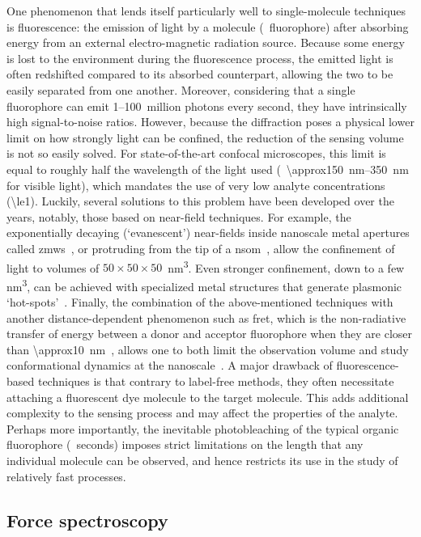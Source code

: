 One phenomenon that lends itself particularly well to single-molecule techniques is fluorescence: the
emission of light by a molecule (\ie~fluorophore) after absorbing energy from an external electro-magnetic
radiation source. Because some energy is lost to the environment during the fluorescence process, the emitted
light is often redshifted compared to its absorbed counterpart, allowing the two to be easily separated from
one another. Moreover, considering that a single fluorophore can emit \numrange{1}{100}~million photons every
second, they have intrinsically high signal-to-noise ratios. However, because the diffraction poses a physical
lower limit on how strongly light can be confined, the reduction of the sensing volume is not so easily
solved. For state-of-the-art confocal microscopes, this limit is equal to roughly half the wavelength of the
light used (\ie~\SIrange{\approx150}{350}{\nm} for visible light), which mandates the use of very low
analyte concentrations (\SI{\le1}{\nM}). Luckily, several solutions to this problem have been developed over
the years, notably, those based on near-field techniques. For example, the exponentially decaying
(`evanescent') near-fields inside nanoscale metal apertures called
\glspl{zmw}~\cite{Levene-2003,Eid-2009,Zhu-2012}, or protruding from the tip of a
\gls{nsom}~\cite{Ambrose-1994,Hosaka-2001}, allow the confinement of light to volumes of
$50\times50\times50$~\si{\cubic\nm}. Even stronger confinement, down to a few \si{\cubic\nm}, can be achieved
with specialized metal structures that generate plasmonic `hot-spots'~\cite{Xin-Lu-2019}. Finally, the
combination of the above-mentioned techniques with another distance-dependent phenomenon such as \gls{fret},
which is the non-radiative transfer of energy between a donor and acceptor fluorophore when they are closer
than \SI{\approx10}{\nm}~\cite{Roy-2008}, allows one to both limit the observation volume and study
conformational dynamics at the nanoscale~\cite{Kim-2013}. A major drawback of fluorescence-based techniques is
that contrary to label-free methods, they often necessitate attaching a fluorescent dye molecule to the
target molecule. This adds additional complexity to the sensing process and may affect the properties of the
analyte. Perhaps more importantly, the inevitable photobleaching of the typical organic fluorophore
(\ie~seconds) imposes strict limitations on the length that any individual molecule can be observed, and hence
restricts its use in the study of relatively fast processes.


\subsection{Force spectroscopy}
%

